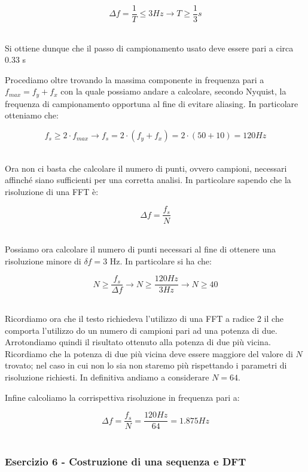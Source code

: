\documentclass[../main.tex]{subfiles}
\begin{document}
\[ \Delta f = \frac{1}{T}  \leq 3 \unit{Hz} \rightarrow T \geq \frac{1}{3} \unit{s} \]\

Si ottiene dunque che il passo di campionamento usato deve essere pari a circa 0.33 s

Procediamo oltre trovando la massima componente in frequenza pari a $f_{max} = f_y + f_x$ con la quale possiamo andare a calcolare, secondo Nyquist, la frequenza di campionamento opportuna al fine di evitare aliasing.
In particolare otteniamo che:

\[ f_s \ge 2 \cdot f_{max} \rightarrow f_s = 2 \cdot (f_y + f_x) = 2 \cdot (50 + 10) = 120 \unit{Hz} \]\

Ora non ci basta che calcolare il numero di punti, ovvero campioni, necessari affinché siano sufficienti per una corretta analisi.
In particolare sapendo che la risoluzione di una FFT è:

\[ \Delta f = \frac{f_s}{N} \]\

Possiamo ora calcolare il numero di punti necessari al fine di ottenere una risoluzione minore di $\delta f = 3$ Hz.
In particolare si ha che:

\[ N \geq \frac{f_s}{\Delta f} \rightarrow  N \geq \frac{120 \unit{Hz}}{3\unit{Hz}} \rightarrow N \geq  40 \]\

Ricordiamo ora che il testo richiedeva l'utilizzo di una FFT a radice 2 il che comporta l'utilizzo do un numero di campioni pari ad una potenza di due.
Arrotondiamo quindi il risultato ottenuto alla potenza di due più vicina. Ricordiamo che la potenza di due più vicina deve essere maggiore del valore di $N$ trovato; nel caso in cui non lo sia non staremo più rispettando i parametri di risoluzione richiesti.
In definitiva andiamo a considerare $N = 64$.

Infine calcoliamo la corrispettiva risoluzione in frequenza pari a:

\[ \Delta f = \frac{f_s}{N} = \frac{120 \unit{Hz}}{64} = 1.875 \unit{Hz} \]\

















\subsubsection{Esercizio 6 - Costruzione di una sequenza e DFT}
\end{document}
